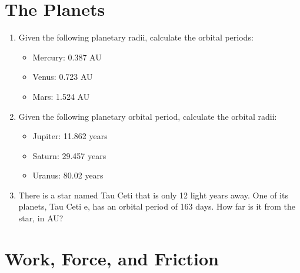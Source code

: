 \documentclass[10pt]{article}
\begin{document}
\section{The Planets}

\begin{enumerate}
\item Given the following planetary radii, calculate the orbital periods:
\begin{itemize}
\item Mercury: 0.387 AU
\item Venus: 0.723 AU
\item Mars: 1.524 AU
\end{itemize}
\item Given the following planetary orbital period, calculate the orbital radii:
\begin{itemize}
\item Jupiter: 11.862 years
\item Saturn: 29.457 years
\item Uranus: 80.02 years
\end{itemize}
\item There is a star named Tau Ceti that is only 12 light years away.  One of its planets, Tau Ceti e, has an orbital period of 163 days.  How far is it from the star, in AU?
\end{enumerate}

\section{Work, Force, and Friction}
\end{document}

